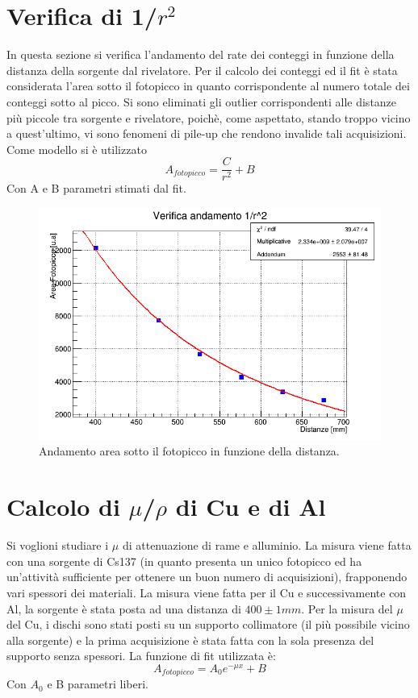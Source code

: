 \documentclass[a4paper]{article}
\begin{document}
\section{Verifica di 1/$r^2$}
In questa sezione si verifica l'andamento del rate dei conteggi in funzione della distanza della sorgente dal rivelatore. Per il calcolo dei conteggi ed il fit è stata considerata l'area sotto il fotopicco in quanto corrispondente al numero totale dei conteggi sotto al picco. Si sono eliminati gli outlier corrispondenti alle distanze più piccole tra sorgente e rivelatore, poichè, come aspettato, stando troppo vicino a quest'ultimo, vi sono fenomeni di pile-up che rendono invalide tali acquisizioni. Come modello si è utilizzato \begin{equation}
A_{fotopicco}=\frac{C}{r^{2}}+B
\end{equation}
Con A e B parametri stimati dal fit.
\begin{figure}[H]
\includegraphics[width=1\textwidth]{inverserootlawwithpars}
        \caption{Andamento area sotto il fotopicco in funzione della distanza.}
        \label{fig:2}
\end{figure}

\section{Calcolo di $\mu$/$\rho$ di Cu e di Al}
Si voglioni studiare i $\mu$ di attenuazione di rame e alluminio. La misura viene fatta con una sorgente di Cs137 (in quanto presenta un unico fotopicco ed ha un'attività sufficiente per ottenere un buon numero di acquisizioni), frapponendo vari spessori dei materiali. La misura viene fatta per il Cu e successivamente con Al, la sorgente è stata posta ad una distanza di $400  \pm 1mm$. Per la misura del $\mu$ del Cu, i dischi sono stati posti su un supporto collimatore (il più possibile vicino alla sorgente) e la prima acquisizione è stata fatta con la sola presenza del supporto senza spessori.  La funzione di fit utilizzata è:
\begin{equation}
A_{fotopicco}=A_{0}e^{-\mu x} + B
\end{equation}
Con $A_{0}$ e B parametri liberi.
\end{document}
